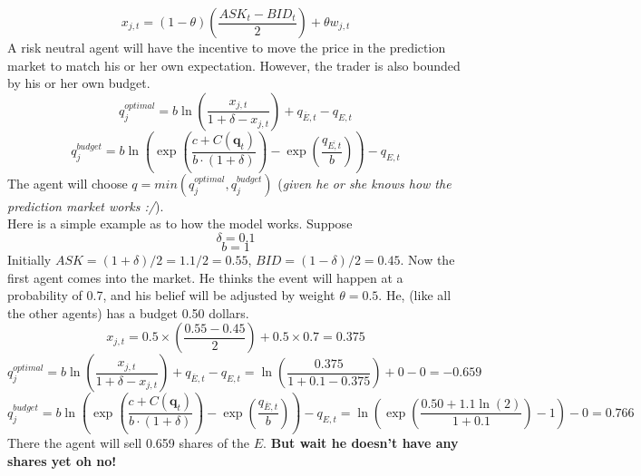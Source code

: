 \documentclass{article}
\begin{document}
\begin{displaymath}
x_{j,t}=(1-\theta)(\frac{ASK_t-BID_t}{2})+\theta w_{j,t}
\end{displaymath}
A risk neutral agent will have the incentive to move the price in the prediction market to match his or her own expectation. However, the trader is also bounded by his or her own budget.
\begin{displaymath}
q_j^{optimal}=b\ln({\frac{x_{j,t}}{1+\delta-x_{j,t}}})+q_{\overline{E},t}-q_{E,t}
\end{displaymath}
\begin{displaymath}
q_j^{budget}=b\ln({\exp(\frac{c+C(\textbf{q}_t)}{b\cdot (1+\delta)})-\exp(\frac{q_{\overline{{E},t}}}{b})})-q_{E,t}
\end{displaymath}
The agent will choose $q=min(q_j^{optimal}, q_j^{budget})$ (\emph{given he or she knows how the prediction market works :/}). \\
Here is a simple example as to how the model works. Suppose
\begin{displaymath}
\delta = 0.1
\end{displaymath}
\begin{displaymath}
b = 1
\end{displaymath}
Initially $ASK=(1+\delta)/2=1.1/2=0.55$, $BID=(1-\delta)/2=0.45$.
Now the first agent comes into the market. He thinks the event will happen at a probability of 0.7, and his belief will be adjusted by weight $\theta=0.5$. He, (like all the other agents) has a budget 0.50 dollars.
\begin{displaymath}
x_{j,t}=0.5\times (\frac{0.55-0.45}{2})+0.5\times 0.7=0.375
\end{displaymath}
\begin{displaymath}
q_j^{optimal}=b\ln({\frac{x_{j,t}}{1+\delta-x_{j,t}}})+q_{\overline{E},t}-q_{E,t}=\ln({\frac{0.375}{1+0.1-0.375}})+0-0=-0.659
\end{displaymath}
\begin{displaymath}
q_j^{budget}=b\ln({\exp(\frac{c+C(\textbf{q}_t)}{b\cdot (1+\delta)})-\exp(\frac{q_{\overline{{E}},t}}{b})})-q_{E,t}=\ln({\exp(\frac{0.50+1.1\ln(2)}{1+0.1})-1})-0=0.766
\end{displaymath}
There the agent will sell 0.659 shares of the $E$. \textbf{But wait he doesn't have any shares yet oh no!}
\end{document}
